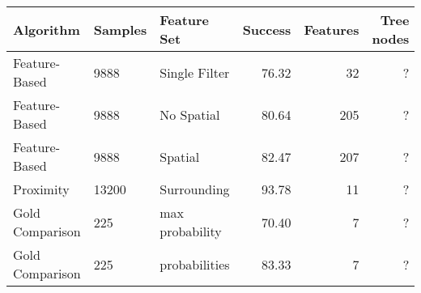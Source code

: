 
\begin{tabular}{lllrrr}
Algorithm & Samples & Feature Set & Success & Features & Tree nodes \\\hline
Feature-Based & 9888 & Single Filter &  76.32 & 32  & ? \\
Feature-Based & 9888 & No Spatial &  80.64 & 205 & ? \\
Feature-Based & 9888 & Spatial &  82.47 & 207 & ? \\
Proximity & 13200 & Surrounding & 93.78 & 11 & ? \\
Gold Comparison & 225 & max probability & 70.40 & 7 & ? \\
Gold Comparison & 225 & probabilities & 83.33 & 7 & ? \\
\end{tabular}

